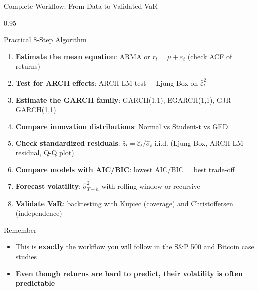 \documentclass[9pt, aspectratio=169, t]{beamer}
\begin{document}
\begin{frame}{Complete Workflow: From Data to Validated VaR}
    \begin{cminipage}{0.95\textwidth}
        \vspace{-0.2cm}
        \scriptsize
        \begin{block}{Practical 8-Step Algorithm}
            \begin{enumerate}\setlength{\itemsep}{1pt}
                \item \textbf{Estimate the mean equation}: ARMA or $r_t = \mu + \varepsilon_t$ (check ACF of returns)
                \item \textbf{Test for ARCH effects}: ARCH-LM test + Ljung-Box on $\hat{\varepsilon}_t^2$
                \item \textbf{Estimate the GARCH family}: GARCH(1,1), EGARCH(1,1), GJR-GARCH(1,1)
                \item \textbf{Compare innovation distributions}: Normal vs Student-t vs GED
                \item \textbf{Check standardized residuals}: $\hat{z}_t = \hat{\varepsilon}_t / \hat{\sigma}_t$ i.i.d. (Ljung-Box, ARCH-LM residual, Q-Q plot)
                \item \textbf{Compare models with AIC/BIC}: lowest AIC/BIC = best trade-off
                \item \textbf{Forecast volatility}: $\hat{\sigma}_{T+h}^2$ with rolling window or recursive
                \item \textbf{Validate VaR}: backtesting with Kupiec (coverage) and Christoffersen (independence)
            \end{enumerate}
        \end{block}
        \vspace{-1.5mm}
        \begin{alertblock}{Remember}
            \begin{itemize}\setlength{\itemsep}{0pt}
                \item This is \textbf{exactly} the workflow you will follow in the S\&P 500 and Bitcoin case studies
                \item \textbf{Even though returns are hard to predict, their volatility is often predictable}
            \end{itemize}
        \end{alertblock}
    \end{cminipage}
\end{frame}
\end{document}
